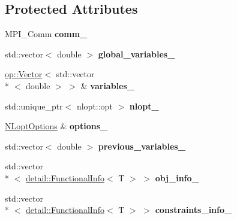 \subsection*{Protected Attributes}
\begin{DoxyCompactItemize}
\item 
\hypertarget{classop_1_1NLopt_a1d365f27aac2aa7f534759f3d8a29543}{M\-P\-I\-\_\-\-Comm {\bfseries comm\-\_\-}}\label{classop_1_1NLopt_a1d365f27aac2aa7f534759f3d8a29543}

\item 
\hypertarget{classop_1_1NLopt_a7045da58c5ed2236a183ed9a6e68b1ff}{std\-::vector$<$ double $>$ {\bfseries global\-\_\-variables\-\_\-}}\label{classop_1_1NLopt_a7045da58c5ed2236a183ed9a6e68b1ff}

\item 
\hypertarget{classop_1_1NLopt_aba440212096236a4dc975e0b75dcfc08}{\hyperlink{classop_1_1Vector}{op\-::\-Vector}$<$ std\-::vector\\*
$<$ double $>$ $>$ \& {\bfseries variables\-\_\-}}\label{classop_1_1NLopt_aba440212096236a4dc975e0b75dcfc08}

\item 
\hypertarget{classop_1_1NLopt_a2591bf6066bb893841376cd98de05410}{std\-::unique\-\_\-ptr$<$ nlopt\-::opt $>$ {\bfseries nlopt\-\_\-}}\label{classop_1_1NLopt_a2591bf6066bb893841376cd98de05410}

\item 
\hypertarget{classop_1_1NLopt_a89cfca2c991cb9a0fcb188a7a2fb7515}{\hyperlink{structop_1_1NLoptOptions}{N\-Lopt\-Options} \& {\bfseries options\-\_\-}}\label{classop_1_1NLopt_a89cfca2c991cb9a0fcb188a7a2fb7515}

\item 
\hypertarget{classop_1_1NLopt_a3f57509a1e31358e7557074efd3c6085}{std\-::vector$<$ double $>$ {\bfseries previous\-\_\-variables\-\_\-}}\label{classop_1_1NLopt_a3f57509a1e31358e7557074efd3c6085}

\item 
\hypertarget{classop_1_1NLopt_a16d7a19a7c9b1d78f06f7f1090277e5d}{std\-::vector\\*
$<$ \hyperlink{structop_1_1detail_1_1FunctionalInfo}{detail\-::\-Functional\-Info}$<$ T $>$ $>$ {\bfseries obj\-\_\-info\-\_\-}}\label{classop_1_1NLopt_a16d7a19a7c9b1d78f06f7f1090277e5d}

\item 
\hypertarget{classop_1_1NLopt_aded0811d6cc7ab5792396c7bdf7f8ef1}{std\-::vector\\*
$<$ \hyperlink{structop_1_1detail_1_1FunctionalInfo}{detail\-::\-Functional\-Info}$<$ T $>$ $>$ {\bfseries constraints\-\_\-info\-\_\-}}\label{classop_1_1NLopt_aded0811d6cc7ab5792396c7bdf7f8ef1}


\end{DoxyCompactItemize}
